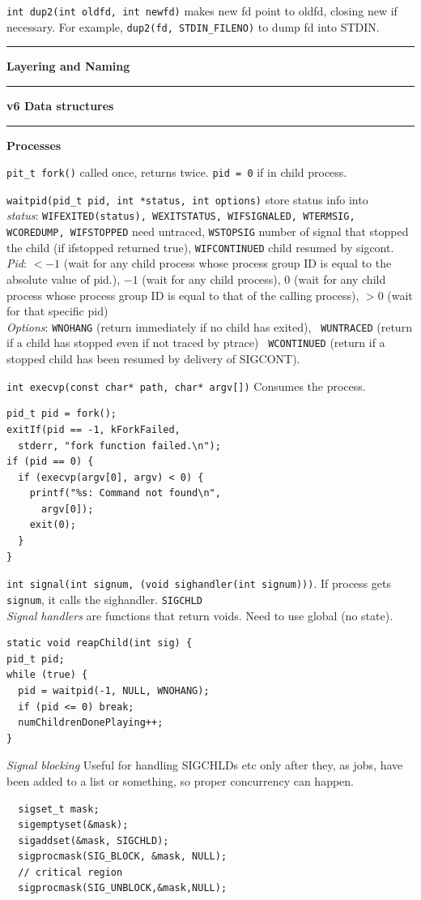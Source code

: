 \documentclass{article}
\begin{document}
\begin{multicols}{2}
  {\tt int dup2(int oldfd, int newfd)} makes new fd point to oldfd, closing new
  if necessary. For example, {\tt dup2(fd, STDIN\_FILENO)} to dump fd into STDIN.

  \noindent\rule{4cm}{0.4pt}

  {\bf Layering and Naming}

  \noindent\rule{4cm}{0.4pt}

  {\bf v6 Data structures}

  \noindent\rule{4cm}{0.4pt}

  {\bf Processes}

  {\tt pit\_t fork()} called once, returns twice. {\tt pid = 0} if in child
  process.

  {\tt waitpid(pid\_t pid, int *status, int options)} store status info into\\
  {\it status}: {\tt WIFEXITED(status), WEXITSTATUS, WIFSIGNALED, WTERMSIG, WCOREDUMP,
  WIFSTOPPED} need untraced, {\tt WSTOPSIG} number of signal that stopped the
  child (if ifstopped returned true), {\tt WIFCONTINUED} child resumed by
  sigcont.\\
  {\it Pid}: $<-1$ (wait for any child process whose process group ID is equal to the
  absolute value of pid.), $-1$ (wait for any child process), $0$ (wait for any
  child process whose process group ID is equal to that of the calling process),
  $>0$ (wait for that specific pid)\\
  {\it Options}: {\tt WNOHANG} (return immediately if no child has exited), {\tt
  WUNTRACED} (return if a child has stopped even if not traced by ptrace) {\tt
  WCONTINUED} (return if a stopped child has been resumed by delivery of
  SIGCONT).

  {\tt int execvp(const char* path, char* argv[])} Consumes the process.
\begin{verbatim}
pid_t pid = fork();
exitIf(pid == -1, kForkFailed,
  stderr, "fork function failed.\n");
if (pid == 0) {
  if (execvp(argv[0], argv) < 0) {
    printf("%s: Command not found\n",
      argv[0]);
    exit(0);
  }
}\end{verbatim}

  {\tt int signal(int signum, (void sighandler(int signum)))}. If process gets
  {\tt signum}, it calls the sighandler. {\tt SIGCHLD}\\
  {\it Signal handlers} are functions that return voids. Need to use global (no
  state).
  \begin{verbatim}
static void reapChild(int sig) {
pid_t pid;
while (true) {
  pid = waitpid(-1, NULL, WNOHANG);
  if (pid <= 0) break;
  numChildrenDonePlaying++;
} \end{verbatim}
  {\it Signal blocking} Useful for handling SIGCHLDs etc only after they, as
  jobs, have been added to a list or something, so proper concurrency can
  happen.
  \begin{verbatim}
  sigset_t mask;
  sigemptyset(&mask);
  sigaddset(&mask, SIGCHLD);
  sigprocmask(SIG_BLOCK, &mask, NULL);
  // critical region
  sigprocmask(SIG_UNBLOCK,&mask,NULL);\end{verbatim}


\end{multicols}
\end{document}

